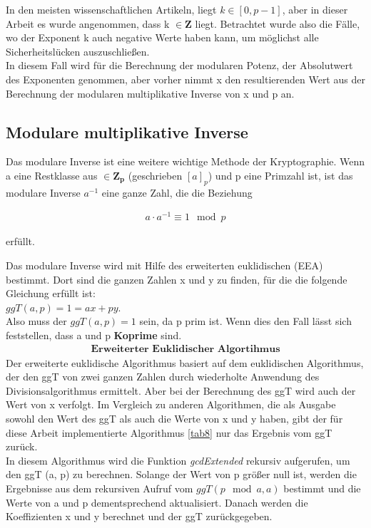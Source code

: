 In den meisten wissenschaftlichen Artikeln, liegt $ k \in [0, p-1] $, aber in dieser Arbeit es wurde angenommen, dass k $ \in \mathbf{Z}$ liegt. 
Betrachtet wurde also die Fälle, wo der Exponent k auch negative
Werte haben kann, um möglichst alle Sicherheitslücken  auszuschließen. \\

In diesem Fall wird für die Berechnung der modularen
Potenz, der Absolutwert des Exponenten genommen, aber
vorher nimmt x den
resultierenden Wert aus der Berechnung der modularen multiplikative Inverse von x und p an.


\subsection{Modulare multiplikative Inverse}

Das modulare Inverse ist eine weitere wichtige Methode der Kryptographie. Wenn a eine Restklasse aus $\in \mathbf{Z_p} $  (geschrieben $[a]_p$) und p eine Primzahl ist, ist das
modulare Inverse $ a^{-1} $ eine ganze Zahl, die die Beziehung 
\begin{ceqn}
 \begin{align*}
     a \cdot a^{-1} \equiv 1 \mod p 
 \end{align*}
\end{ceqn} erfüllt.

Das modulare Inverse wird mit Hilfe des erweiterten euklidischen (EEA) bestimmt.
Dort sind die ganzen Zahlen x und y zu finden, für die die folgende Gleichung erfüllt ist: \\
$ ggT (a, p) = 1 = ax + py $. \\
Also muss der $ ggT (a, p) = 1 $ sein, da p prim ist. Wenn dies den Fall lässt sich feststellen, dass a und p \textbf{Koprime} sind.
\begin{align*}
    \textbf{Erweiterter Euklidischer Algortihmus}
\end{align*}
Der erweiterte euklidische Algorithmus basiert auf dem euklidischen Algorithmus, der den ggT von zwei ganzen Zahlen durch wiederholte Anwendung des Divisionsalgorithmus ermittelt. Aber bei der Berechnung des ggT wird auch der Wert von x verfolgt. Im Vergleich zu anderen Algorithmen, die als Ausgabe sowohl den Wert des ggT als auch die Werte von x und y haben, gibt der für diese Arbeit implementierte Algorithmus \ref{tab8} nur das Ergebnis vom ggT zurück. \\

In diesem Algorithmus wird die Funktion \textit{gcdExtended} rekursiv aufgerufen, um den ggT (a, p) zu berechnen. Solange der Wert von p größer null ist, werden die Ergebnisse aus dem rekursiven Aufruf vom \( ggT (p \mod a, a) \) bestimmt und die Werte von a und p dementsprechend aktualisiert. Danach werden die Koeffizienten x und y berechnet und der ggT zurückgegeben.

